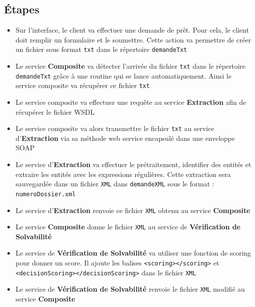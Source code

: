 \documentclass{article}
\begin{document}
	\subsection{Étapes}
	  \begin{itemize}
	  	\item Sur l’interface, le client va effectuer une demande de prêt. Pour cela, le client doit remplir un formulaire et le soumettre. Cette action va permettre de créer un fichier sous format \texttt{txt} dans le répertoire \texttt{demandeTxt}
	  	
	  	\item Le service \textbf{Composite} va détecter l’arrivée du fichier \texttt{txt} dans le répertoire \texttt{demandeTxt} grâce à une routine qui se lance automatiquement. Ainsi le service composite va récupérer ce fichier \texttt{txt}
	  	
	  	\item Le service composite va effectuer une requête au service \textbf{Extraction} afin de récupérer le fichier WSDL
	  	
	  	\item Le service composite va alors transmettre le fichier \texttt{txt} au service d’\textbf{Extraction} via sa méthode web service encapsulé dans une enveloppe SOAP
	  	
	  	\item Le service d’\textbf{Extraction} va effectuer le prétraitement, identifier des entités et extraire les entités avec les expressions régulières. Cette extraction sera sauvegardée dans un fichier \texttt{XML} dans \texttt{demandeXML} sous le format : \texttt{numeroDossier.xml}
	  	
	  	\item Le service d’\textbf{Extraction} renvoie ce fichier \texttt{XML} obtenu au service \textbf{Composite}
	  	
	  	\item Le service \textbf{Composite} donne le fichier \texttt{XML} au service de \textbf{Vérification de Solvabilité}
	  	
	  	\item Le service de \textbf{Vérification de Solvabilité} va utiliser une fonction de scoring pour donner un score. Il ajoute les balises \texttt{<scoring></scoring>} et \texttt{<decisionScoring></decisionScoring>} dans le fichier \texttt{XML}
	  	
	  	\item Le service de \textbf{Vérification de Solvabilité} renvoie le fichier \texttt{XML} modifié au service \textbf{Composite}
	  

\end{itemize}
\end{document}
